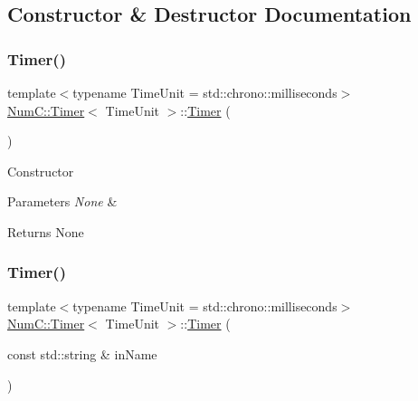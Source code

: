 \subsection{Constructor \& Destructor Documentation}
\mbox{\label{class_num_c_1_1_timer_ab2d0eea21abbc5662104d5513d859378}} 
\subsubsection{\texorpdfstring{Timer()}{Timer()}\hspace{0.1cm}{\footnotesize\ttfamily [1/2]}}
{\footnotesize\ttfamily template$<$typename Time\+Unit  = std\+::chrono\+::milliseconds$>$ \\
\mbox{\hyperlink{class_num_c_1_1_timer}{Num\+C\+::\+Timer}}$<$ Time\+Unit $>$\+::\mbox{\hyperlink{class_num_c_1_1_timer}{Timer}} (\begin{DoxyParamCaption}{ }\end{DoxyParamCaption})\hspace{0.3cm}{\ttfamily [inline]}}

Constructor


\begin{DoxyParams}{Parameters}
{\em None} & \\
\hline
\end{DoxyParams}
\begin{DoxyReturn}{Returns}
None 
\end{DoxyReturn}
\mbox{\label{class_num_c_1_1_timer_a34cba7414c4331acbbd26fadff6eb5be}} 
\subsubsection{\texorpdfstring{Timer()}{Timer()}\hspace{0.1cm}{\footnotesize\ttfamily [2/2]}}
{\footnotesize\ttfamily template$<$typename Time\+Unit  = std\+::chrono\+::milliseconds$>$ \\
\mbox{\hyperlink{class_num_c_1_1_timer}{Num\+C\+::\+Timer}}$<$ Time\+Unit $>$\+::\mbox{\hyperlink{class_num_c_1_1_timer}{Timer}} (\begin{DoxyParamCaption}\item[{const std\+::string \&}]{in\+Name }\end{DoxyParamCaption})\hspace{0.3cm}{\ttfamily [inline]}}

